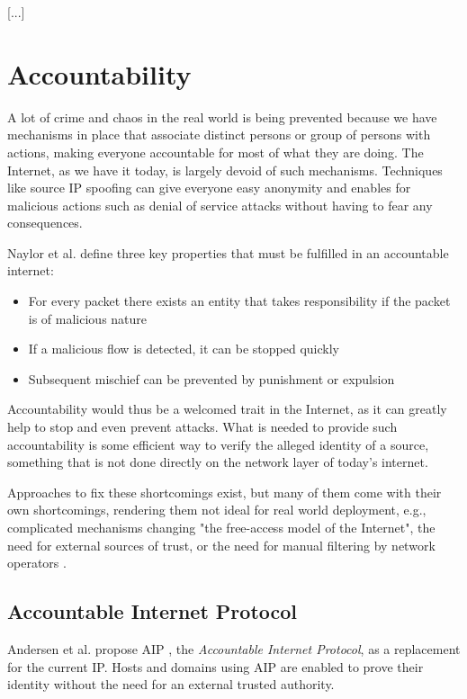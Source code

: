 \documentclass{acm_proc_article-sp}
\begin{document}
[...]


\section{Accountability}
\cite{bootstrapping} \cite{mirkovic}
\label{sec:acc}
A lot of crime and chaos in the real world is being prevented because we have mechanisms in place that associate distinct persons or group of persons with actions, making everyone accountable for most of what they are doing. The Internet, as we have it today, is largely devoid of such mechanisms. Techniques like source IP spoofing can give everyone easy anonymity and enables for malicious actions such as denial of service attacks without having to fear any consequences.

Naylor et al. \cite{apip} define three key properties that must be fulfilled in an accountable internet:
\begin{itemize}
\item For every packet there exists an entity that takes responsibility if the packet is of malicious nature
\item If a malicious flow is detected, it can be stopped quickly
\item Subsequent mischief can be prevented by punishment or expulsion
\end{itemize}

Accountability would thus be a welcomed trait in the Internet, as it can greatly help to stop and even prevent attacks. What is needed to provide such accountability is some efficient way to verify the alleged identity of a source, something that is not done directly on the network layer of today's internet. 

Approaches to fix these shortcomings exist, but many of them come with their own shortcomings, rendering them not ideal for real world deployment, e.g., complicated mechanisms changing "the free-access model of the Internet", the need for external sources of trust, or the need for manual filtering by network operators \cite{aip}.

\subsection{Accountable Internet Protocol}
\label{sec:aip}
Andersen et al. propose AIP \cite{aip}, the \emph{Accountable Internet Protocol}, as a replacement for the current IP. Hosts and domains using AIP are enabled to prove their identity without the need for an external trusted authority.
\end{document}
